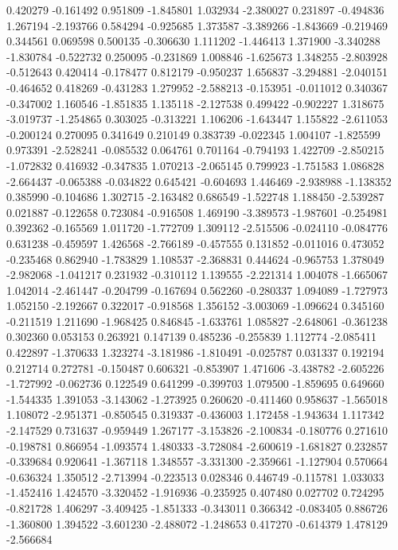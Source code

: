 0.420279
-0.161492
0.951809
-1.845801
1.032934
-2.380027
0.231897
-0.494836
1.267194
-2.193766
0.584294
-0.925685
1.373587
-3.389266
-1.843669
-0.219469
0.344561
0.069598
0.500135
-0.306630
1.111202
-1.446413
1.371900
-3.340288
-1.830784
-0.522732
0.250095
-0.231869
1.008846
-1.625673
1.348255
-2.803928
-0.512643
0.420414
-0.178477
0.812179
-0.950237
1.656837
-3.294881
-2.040151
-0.464652
0.418269
-0.431283
1.279952
-2.588213
-0.153951
-0.011012
0.340367
-0.347002
1.160546
-1.851835
1.135118
-2.127538
0.499422
-0.902227
1.318675
-3.019737
-1.254865
0.303025
-0.313221
1.106206
-1.643447
1.155822
-2.611053
-0.200124
0.270095
0.341649
0.210149
0.383739
-0.022345
1.004107
-1.825599
0.973391
-2.528241
-0.085532
0.064761
0.701164
-0.794193
1.422709
-2.850215
-1.072832
0.416932
-0.347835
1.070213
-2.065145
0.799923
-1.751583
1.086828
-2.664437
-0.065388
-0.034822
0.645421
-0.604693
1.446469
-2.938988
-1.138352
0.385990
-0.104686
1.302715
-2.163482
0.686549
-1.522748
1.188450
-2.539287
0.021887
-0.122658
0.723084
-0.916508
1.469190
-3.389573
-1.987601
-0.254981
0.392362
-0.165569
1.011720
-1.772709
1.309112
-2.515506
-0.024110
-0.084776
0.631238
-0.459597
1.426568
-2.766189
-0.457555
0.131852
-0.011016
0.473052
-0.235468
0.862940
-1.783829
1.108537
-2.368831
0.444624
-0.965753
1.378049
-2.982068
-1.041217
0.231932
-0.310112
1.139555
-2.221314
1.004078
-1.665067
1.042014
-2.461447
-0.204799
-0.167694
0.562260
-0.280337
1.094089
-1.727973
1.052150
-2.192667
0.322017
-0.918568
1.356152
-3.003069
-1.096624
0.345160
-0.211519
1.211690
-1.968425
0.846845
-1.633761
1.085827
-2.648061
-0.361238
0.302360
0.053153
0.263921
0.147139
0.485236
-0.255839
1.112774
-2.085411
0.422897
-1.370633
1.323274
-3.181986
-1.810491
-0.025787
0.031337
0.192194
0.212714
0.272781
-0.150487
0.606321
-0.853907
1.471606
-3.438782
-2.605226
-1.727992
-0.062736
0.122549
0.641299
-0.399703
1.079500
-1.859695
0.649660
-1.544335
1.391053
-3.143062
-1.273925
0.260620
-0.411460
0.958637
-1.565018
1.108072
-2.951371
-0.850545
0.319337
-0.436003
1.172458
-1.943634
1.117342
-2.147529
0.731637
-0.959449
1.267177
-3.153826
-2.100834
-0.180776
0.271610
-0.198781
0.866954
-1.093574
1.480333
-3.728084
-2.600619
-1.681827
0.232857
-0.339684
0.920641
-1.367118
1.348557
-3.331300
-2.359661
-1.127904
0.570664
-0.636324
1.350512
-2.713994
-0.223513
0.028346
0.446749
-0.115781
1.033033
-1.452416
1.424570
-3.320452
-1.916936
-0.235925
0.407480
0.027702
0.724295
-0.821728
1.406297
-3.409425
-1.851333
-0.343011
0.366342
-0.083405
0.886726
-1.360800
1.394522
-3.601230
-2.488072
-1.248653
0.417270
-0.614379
1.478129
-2.566684
